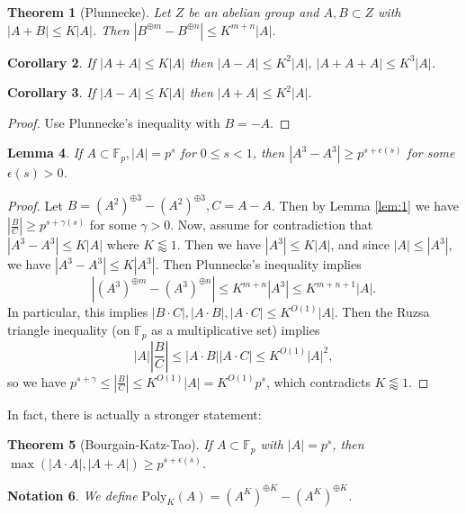 \documentclass[12pt]{amsart}
\newtheorem{theorem}{Theorem}[section]
\newtheorem{lemma}[theorem]{Lemma}
\newtheorem{notation}[theorem]{Notation}
\newtheorem{corollary}[theorem]{Corollary}
\newcommand{\F}{\mathbb{F}}
\newcommand{\eps}{\epsilon}
\newcommand{\poly}{\mathrm{Poly}}
\begin{document}
\begin{theorem}[Plunnecke]
    Let $Z$ be an abelian group and $A,B\subset Z$ with $|A+B|\leq K|A|$. Then $|B^{\oplus m}-B^{\oplus n}|\leq K^{m+n}|A|$.
\end{theorem}

\begin{corollary}
    If $|A+A|\leq K|A|$ then $|A-A|\leq K^2|A|$, $|A+A+A|\leq K^3|A|$.
\end{corollary}

\begin{corollary}
    If $|A-A|\leq K|A|$ then $|A+A|\leq K^2|A|$.
\end{corollary}
\begin{proof}
    Use Plunnecke's inequality with $B=-A$.
\end{proof}

\begin{lemma}\label{lem:2}
    If $A\subset\F_p,|A|=p^s$ for $0\leq s<1$, then $|A^3-A^3|\geq p^{s+\eps(s)}$ for some $\eps(s)>0$.
\end{lemma}
\begin{proof}
    Let $B=(A^2)^{\oplus 3}-(A^2)^{\oplus 3},C=A-A$. Then by Lemma \ref{lem:1} we have $\left|\frac{B}{C}\right|\geq p^{s+\gamma(s)}$ for some $\gamma>0$. Now, assume for contradiction that $|A^3-A^3|\leq K|A|$ where $K\lessapprox 1$. Then we have $|A^3|\leq K|A|$, and since $|A|\leq|A^3|$, we have $|A^3-A^3|\leq K|A^3|$. Then Plunnecke's inequality implies
    $$|(A^3)^{\oplus m}-(A^3)^{\oplus n}|\leq K^{m+n}|A^3|\leq K^{m+n+1}|A|.$$
    In particular, this implies $|B\cdot C|,|A\cdot B|,|A\cdot C|\leq K^{O(1)}|A|$. Then the Ruzsa triangle inequality (on $\F_p$ as a multiplicative set) implies
    $$|A|\left|\frac{B}{C}\right|\leq|A\cdot B||A\cdot C|\leq K^{O(1)}|A|^2,$$
    so we have $p^{s+\gamma}\leq\left|\frac{B}{C}\right|\leq K^{O(1)}|A|=K^{O(1)}p^s$, which contradicts $K\lessapprox 1$.
\end{proof}

In fact, there is actually a stronger statement:

\begin{theorem}[Bourgain-Katz-Tao]
    If $A\subset\F_p$ with $|A|=p^s$, then $\max(|A\cdot A|,|A+A|)\geq p^{s+\eps(s)}$.
\end{theorem}

\begin{notation}
    We define $\poly_K(A)=(A^K)^{\oplus K}-(A^K)^{\oplus K}$.
\end{notation}
\end{document}
